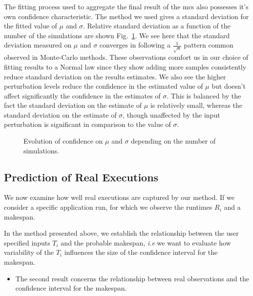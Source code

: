 \documentclass[10pt,conference,compsocconf]{IEEEtran}
\begin{document}
The fitting process used to aggregate the final result of the \ac{mcs} also 
possesses it's own confidence characteristic. The method we used
gives a standard deviation for the fitted value of $\mu$ and $\sigma$. Relative
standard deviation as a function of the number of the simulations are shown
Fig.~\ref{fig:confidence}. We see here that the standard deviation measured on
$\mu$ and $\sigma$ converges in following a $\frac{1}{\sqrt{n}}$ pattern
common observed in Monte-Carlo methods. These observations comfort us in our
choice of fitting results to a Normal law since they show adding more samples
consistently reduce standard deviation on the results estimates. We also see the
higher perturbation levels reduce the confidence in the estimated value of $\mu$
but doesn't affect significantly the confidence in the estimates of $\sigma$.
This is balanced by the fact the standard deviation on the estimate of $\mu$
is relatively small, whereas the standard deviation on the estimate of
$\sigma$, though unaffected by the input perturbation is significant in comparison
to the value of $\sigma$.

\begin{figure}
	\centering
	\resizebox{0.5\textwidth}{!}{%
		
	}
	\resizebox{0.5\textwidth}{!}{%
		
	}
	\caption{Evolution of confidence on $\mu$ and $\sigma$ depending on the
	number of simulations.}
	\label{fig:confidence}
\end{figure}


\subsection{Prediction of Real Executions}
\label{sec:rl}
  
We now examine how well real executions are captured by our method. If we
consider a specific application run, for which we observe the runtimes ${R_i}$ 
and a makespan.


 
In the method presented above, we establish the  relationship between  the user  specified
  inputs ${T_i}$ and the probable makespan, \textit{i.e} we want to evaluate how
  variability  of the  ${T_i}$ influences  the size  of the  confidence interval
  for the makespan. 
\begin{itemize}
\item  The second result concerns the relationship between real observations and 
the confidence interval for the makespan.  
\end{itemize}
\end{document}
